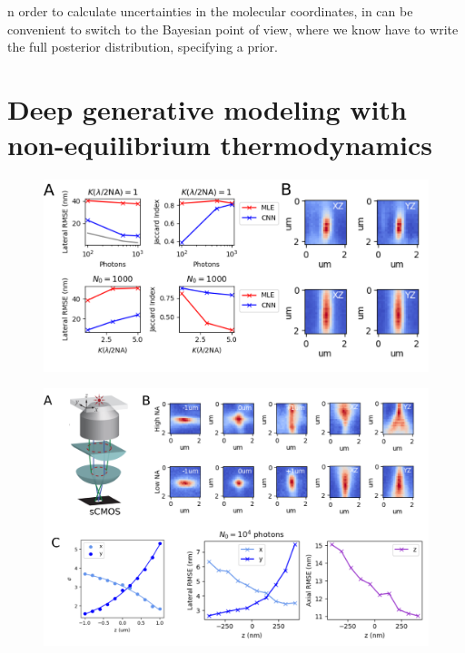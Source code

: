 \documentclass{ucetd}
\begin{document}
n order to calculate uncertainties in the molecular coordinates, in can be convenient to switch to the Bayesian point of view, where we know have to write the full posterior distribution, specifying a prior.


\section{Deep generative modeling with non-equilibrium thermodynamics}

\begin{figure}
\begin{center}
\includegraphics[width=16cm]{PSF2D.png}
\end{center}
\end{figure}

\begin{figure}
\begin{center}
\includegraphics[width=16cm]{Astigmatism.png}
\end{center}
\end{figure}
\end{document}
